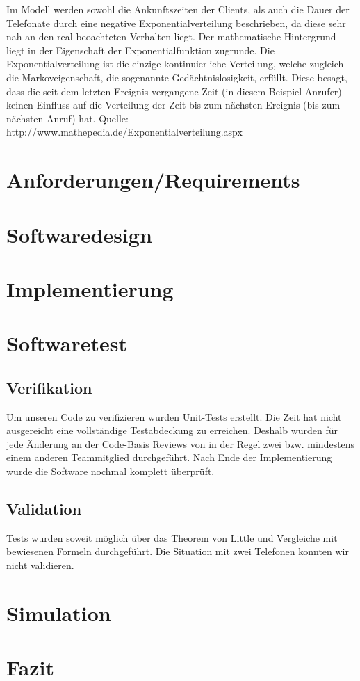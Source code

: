 Im Modell werden sowohl die Ankunftszeiten der Clients, als auch die Dauer der Telefonate durch eine negative Exponentialverteilung beschrieben, da diese sehr nah an den real beoachteten Verhalten liegt. Der mathematische Hintergrund liegt in der Eigenschaft der Exponentialfunktion zugrunde. Die Exponentialverteilung ist die einzige kontinuierliche Verteilung, welche zugleich die Markoveigenschaft, die sogenannte Gedächtnislosigkeit, erfüllt. Diese besagt, dass die seit dem letzten Ereignis vergangene Zeit (in diesem Beispiel Anrufer) keinen Einfluss auf die Verteilung der Zeit bis zum nächsten Ereignis (bis zum nächsten Anruf) hat. 
Quelle: http://www.mathepedia.de/Exponentialverteilung.aspx


\section{Anforderungen/Requirements}

\section{Softwaredesign}

\section{Implementierung}

\section{Softwaretest}

\subsection{Verifikation}

Um unseren Code zu verifizieren wurden Unit-Tests erstellt. Die Zeit hat nicht ausgereicht eine vollständige Testabdeckung zu erreichen. Deshalb wurden für jede Änderung an der Code-Basis Reviews von in der Regel zwei bzw. mindestens einem anderen Teammitglied durchgeführt. Nach Ende der Implementierung wurde die Software nochmal komplett überprüft.

\subsection{Validation}

Tests wurden soweit möglich über das Theorem von Little und Vergleiche mit bewiesenen Formeln durchgeführt. Die Situation mit zwei Telefonen konnten wir nicht validieren. 

\section{Simulation}

\section{Fazit}


